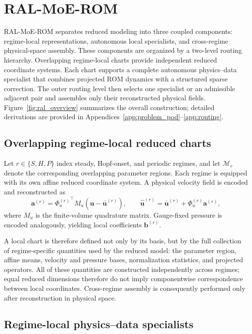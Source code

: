 \section{RAL-MoE-ROM}
\label{sec:method}

RAL-MoE-ROM separates reduced modeling into three coupled components: regime-local representations, autonomous local specialists, and
cross-regime physical-space assembly. These components are organized by a two-level routing hierarchy. Overlapping regime-local charts provide independent reduced coordinate systems. Each chart supports a complete autonomous physics--data specialist that combines projected ROM dynamics with a structured sparse correction. The outer routing level then selects one specialist or an admissible adjacent pair and assembles only their reconstructed physical fields. Figure~\ref{fig:ral_overview} summarizes the overall construction; detailed
derivations are provided in Appendices~\ref{app:problem_pod}--\ref{app:routing}.

\subsection{Overlapping regime-local reduced charts}

Let $r\in\{S,H,P\}$ index steady, Hopf-onset, and periodic regimes, and let $\mathcal M_r$ denote the corresponding overlapping parameter regions. Each regime is equipped with its own affine reduced coordinate system. A physical velocity field is encoded and reconstructed as
\begin{equation}
  \bm a^{(r)}={\Phi_u^{(r)}}^{\top}M_u(\bm u-\bar{\bm u}^{(r)}),\qquad
  \widehat{\bm u}^{(r)}=\bar{\bm u}^{(r)}+\Phi_u^{(r)}\bm a^{(r)},
  \label{eq:main_chart}
\end{equation}
where $M_u$ is the finite-volume quadrature matrix. Gauge-fixed pressure is encoded analogously, yielding local coefficients
$\bm b^{(r)}$. 

A local chart is therefore defined not only by its basis, but by the full collection of regime-specific quantities used by the reduced model: the parameter region, affine means, velocity and pressure bases, normalization statistics, and projected operators.
All of these quantities are constructed independently across regimes; equal reduced dimensions therefore do not imply componentwise
correspondence between local coordinates. Cross-regime assembly is consequently performed only after reconstruction in physical space.

\subsection{Regime-local physics--data specialists}

